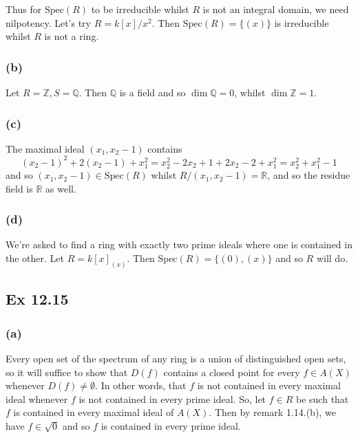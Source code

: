 \documentclass{article}
\theoremstyle{definition}
\newcommand{\Z}{\mathbb{Z}}
\newcommand{\Q}{\mathbb{Q}}
\newcommand{\R}{\mathbb{R}}
\newcommand{\Spec}{\text{Spec}}
\begin{document}
Thus for $\Spec(R)$ to be irreducible whilst $R$ is not an integral domain, we
need nilpotency. Let's try $R = k[x]/x^2$. Then $\Spec(R) = \{(x)\}$ is
irreducible whilst $R$ is not a ring.

\subsubsection*{(b)}

Let $R = \Z, S = \Q$. Then $\Q$ is a field and so $\dim \Q = 0$, whilst $\dim
\Z = 1$. \\

\subsubsection*{(c)}

The maximal ideal $(x_1, x_2 - 1)$ contains 
\[
	(x_2 - 1)^{2} + 2(x_2 - 1) + x_1^2
	=
	x_2^2 - 2x_2 + 1 + 2x_2 - 2 + x_1^2
	=
	x_2^2 + x_1^2 - 1
\] 
and so $(x_1, x_2 - 1) \in \Spec(R)$ whilst $R/(x_1, x_2 - 1) = \R$, and so the
residue field is $\R$ as well.

\subsubsection*{(d)}

We're asked to find a ring with exactly two prime ideals where one is contained
in the other. Let $R = k[x]_{(x)}$. Then $\Spec(R) = \{(0), (x)\}$ and so $R$
will do.

\subsection*{Ex 12.15}

\subsubsection*{(a)}

Every open set of the spectrum of any ring is a union of distinguished open
sets, so it will suffice to show that $D(f)$ contains a closed point for every
$f \in A(X)$ whenever $D(f) \not = \emptyset$. In other words, that $f$ is not
contained in every maximal ideal whenever $f$ is not contained in every prime
ideal. So, let $f \in R$ be such that $f$ is contained in every maximal ideal
of $A(X)$. Then by remark 1.14.(b), we have $f \in \sqrt{0}$ and so $f$ is
contained in every prime ideal. \\
\end{document}
